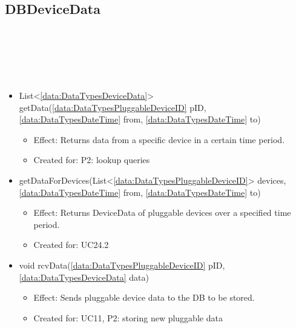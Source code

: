   \subsection{DBDeviceData}\label{int:PluggableDeviceDatabasePluggableDeviceDataDBDBDeviceData}
    \begin{description}
      \item[Provided by:] \iconcomponent{}~
      \item[Required by:] \iconcomponent{}~
      \item[Operations:] ~
    \begin{itemize}[noitemsep,nolistsep,leftmargin=-.25cm]
      \item \textsf{List\textless{}\ref{data:DataTypesDeviceData}\textgreater{} getData(\ref{data:DataTypesPluggableDeviceID} pID, \ref{data:DataTypesDateTime} from, \ref{data:DataTypesDateTime} to)}
        \begin{itemize}[noitemsep,nolistsep]
           \item Effect: Returns data from a specific device in a certain time period.
\item Created for: P2: lookup queries
        \end{itemize}
      \item \textsf{ getDataForDevices(List\textless{}\ref{data:DataTypesPluggableDeviceID}\textgreater{} devices, \ref{data:DataTypesDateTime} from, \ref{data:DataTypesDateTime} to)}
        \begin{itemize}[noitemsep,nolistsep]
           \item Effect: Returns DeviceData of pluggable devices over a specified time period.
\item Created for: UC24.2
        \end{itemize}
      \item \textsf{void rcvData(\ref{data:DataTypesPluggableDeviceID} pID, \ref{data:DataTypesDeviceData} data)}
        \begin{itemize}[noitemsep,nolistsep]
           \item Effect: Sends pluggable device data to the DB to be stored.
\item Created for: UC11, P2: storing new pluggable data
        \end{itemize}
    \end{itemize}
    \end{description}

